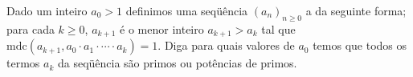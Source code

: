 Dado um inteiro $a_0 > 1$ definimos uma seqüência $(a_n)_{n \ge 0}$ a da seguinte forma; para cada $k \ge 0$, $a_{k+1}$ é o menor inteiro $a_{k+1} > a_k$ tal que $\mathrm{mdc}(a_{k+1}, a_0 \cdot a_1 \cdot \cdots \cdot a_k) = 1$.
Diga para quais valores de $a_0$ temos que todos os termos $a_k$ da seqüência são primos ou potências de primos.